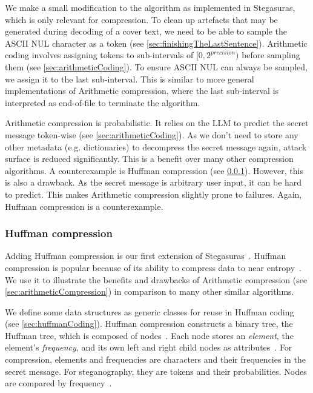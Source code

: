 We make a small modification to the algorithm as implemented in Stegasuras, which is only relevant for compression. To clean up artefacts that may be generated during decoding of a cover text, we need to be able to sample the ASCII NUL character as a token (see \cref{sec:finishingTheLastSentence}). Arithmetic coding involves assigning tokens to sub-intervals of $ [0, 2^{precision}) $ before sampling them (see \cref{sec:arithmeticCoding}). To ensure ASCII NUL can always be sampled, we assign it to the last sub-interval. This is similar to more general implementations of Arithmetic compression, where the last sub-interval is interpreted as end-of-file to terminate the algorithm.

Arithmetic compression is probabilistic. It relies on the \gls{LLM} to predict the secret message token-wise (see \cref{sec:arithmeticCoding}). As we don't need to store any other metadata (e.g. dictionaries) to decompress the secret message again, attack surface is reduced significantly. This is a benefit over many other compression algorithms. A counterexample is Huffman compression (see \cref{sec:huffmanCompression}). However, this is also a drawback. As the secret message is arbitrary user input, it can be hard to predict. This makes Arithmetic compression slightly prone to failures. Again, Huffman compression is a counterexample.

\subsubsection{Huffman compression}
\label{sec:huffmanCompression}
Adding Huffman compression is our first extension of Stegasuras~\cite{zieglerNeuralLinguisticSteganography2019}. Huffman compression is popular because of its ability to compress data to near entropy~\cite{huffmanMethodConstructionMinimumRedundancy1952}. We use it to illustrate the benefits and drawbacks of Arithmetic compression (see \cref{sec:arithmeticCompression}) in comparison to many other similar algorithms.

We define some data structures as generic classes for reuse in Huffman coding (see \cref{sec:huffmanCoding}). Huffman compression constructs a binary tree, the Huffman tree, which is composed of nodes~\cite{huffmanMethodConstructionMinimumRedundancy1952}. Each node stores an \textit{element}, the element's \textit{frequency}, and its own left and right child nodes as attributes~\cite{huffmanMethodConstructionMinimumRedundancy1952}. For compression, elements and frequencies are characters and their frequencies in the secret message. For steganography, they are tokens and their probabilities. Nodes are compared by frequency~\cite{huffmanMethodConstructionMinimumRedundancy1952}.

